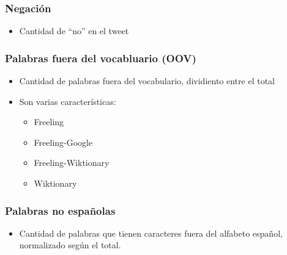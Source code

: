 \begin{frame}
    \frametitle{Negación}

    \begin{itemize}
        \item Cantidad de ``no'' en el tweet
    \end{itemize}
\end{frame}

\begin{frame}
    \frametitle{Palabras fuera del vocabluario (OOV)}

    \begin{itemize}
        \item Cantidad de palabras fuera del vocabulario, dividiento entre el total
        \item Son varias características:
        \begin{itemize}
            \item Freeling
            \item Freeling-Google
            \item Freeling-Wiktionary
            \item Wiktionary
        \end{itemize}
    \end{itemize}
\end{frame}

\begin{frame}
    \frametitle{Palabras no españolas}

    \begin{itemize}
        \item Cantidad de palabras que tienen caracteres fuera del alfabeto español, normalizado según el total.
    \end{itemize}
\end{frame}

